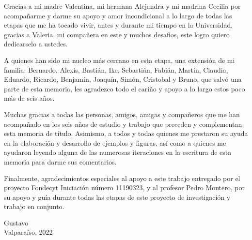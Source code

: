 Gracias a mi madre Valentina, mi hermana Alejandra y mi madrina Cecilia por acompa\~narme y darme su apoyo y amor incondicional a lo largo de todas las etapas que me ha tocado vivir, antes y durante mi tiempo en la Universidad, gracias a Valeria, mi compa\~nera en este y muchos desafios, este logro quiero dedicarselo a ustedes.
\vspace{2mm}

A quienes han sido mi nucleo m\'as cercano en esta etapa, una extensi\'on de mi familia:  Bernardo, Alexis, Basti\'an, Ike, Sebasti\'an, Fabi\'an, Mart\'in, Claudia, Eduardo, Ricardo, Benjam\'in, Joaqu\'in, Sim\'on, Cristobal y Bruno, que salv\'o una parte de esta memoria, les agradezco todo el cari\~no y apoyo a lo largo estos poco m\'as de seis a\~nos.

\vspace{2mm}

Muchas gracias a todas las personas, amigos, amigas y compa\~neros que me han acompa\~nado en los seis a\~nos de estudio y trabajo que preceden y complementan esta memoria de t\'itulo. Asimismo, a todos y todas quienes me prestaron su ayuda en la elaboraci\'on y desarrollo de ejemplos y figuras, as\'i como a quienes me ayudaron leyendo alguna de las numerosas iteraciones en la escritura de esta memoria para darme sus comentarios. 

\vspace{4mm}
Finalmente, agradecimientos especiales al apoyo a este trabajo entregado por el proyecto  Fondecyt Iniciaci\'on n\'umero 11190323, y al profesor Pedro Montero, por su apoyo y gu\'ia durante todas las etapas de este proyecto de investigaci\'on y trabajo en conjunto.

 \vspace{5.5mm}
   
\begin{flushright}
  {Gustavo}\\
  {Valpara\'iso, 2022}
\end{flushright}
